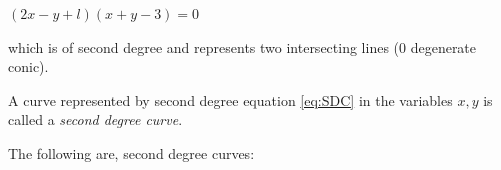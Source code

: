 \documentclass[11pt]{amsbook}
\begin{document}
  \begin{center}
  $(2x - y + l)(x + y - 3) = 0$ %
  \end{center}

which is of second degree and represents two intersecting lines (0 degenerate conic). %

A curve represented by second degree equation \eqref{eq:SDC} in the variables $x, y$ is called a \textit{second degree curve}. %

The following are, second degree curves: 
\end{document}
